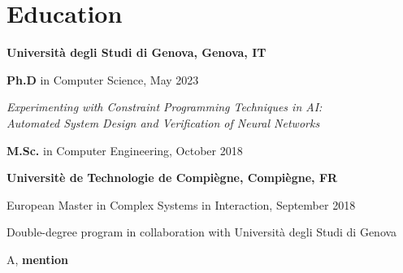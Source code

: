 \section{\sc Education}
{\bf Universit\`a degli Studi di Genova, Genova, IT}
\begin{list1}
	\item[] \textbf{Ph.D} in Computer Science, May 2023
	\item[] \textit{Experimenting with Constraint Programming Techniques
		in AI:\\Automated System Design and Verification of Neural Networks}
\end{list1}
\begin{list1}
\item[] \textbf{M.Sc.} in Computer Engineering, October 2018
\end{list1}

{\bf Universit\`e de Technologie de Compi\`egne, Compi\`egne, FR}
\begin{list1}
	\item[] European Master in Complex Systems in Interaction, September 2018
	\item[] Double-degree program in collaboration with Universit\`a 
	degli Studi di Genova
	\item[] A, \textbf{mention}
\end{list1}
%
